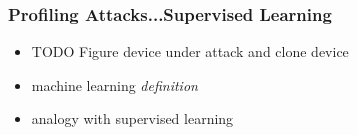 \begin{frame}
\frametitle{Profiling Attacks...Supervised Learning}
\begin{itemize}
\item TODO Figure device under attack and clone device 
\item machine learning \emph{definition}
\item analogy with supervised learning
\end{itemize}

\end{frame}



%

